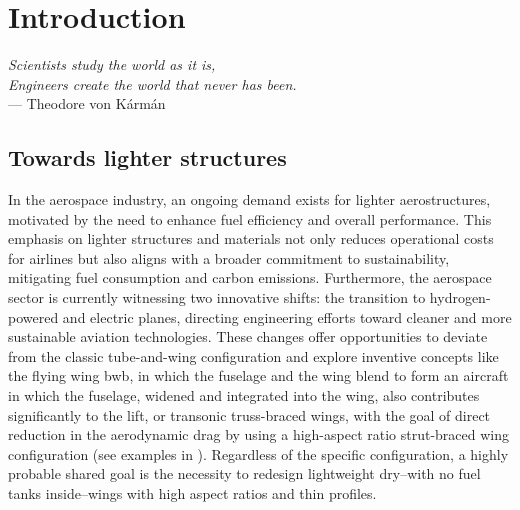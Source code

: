 \newpage
\chapter*{Introduction}
{}
%
\glsresetall %



\textit{Scientists study the world as it is,}\\
\textit{Engineers create the world that never has been.} \vspace{5pt} \\
--- Theodore von K\'arm\'an \\

\section*{Towards lighter structures}

In the aerospace industry, an ongoing demand exists for lighter aerostructures, motivated by the need to enhance fuel efficiency and overall performance. This emphasis on lighter structures and materials not only reduces operational costs for airlines but also aligns with a broader commitment to sustainability, mitigating fuel consumption and carbon emissions. Furthermore, the aerospace sector is currently witnessing two innovative shifts: the transition to hydrogen-powered and electric planes, directing engineering efforts toward cleaner and more sustainable aviation technologies. These changes offer opportunities to deviate from the classic tube-and-wing configuration and explore inventive concepts like the flying wing \gls{bwb}, in which the fuselage and the wing blend to form an aircraft in which the fuselage, widened and integrated into the wing, also contributes significantly to the lift, or transonic truss-braced wings, with the goal of direct reduction in the aerodynamic drag by using a high-aspect ratio strut-braced wing configuration (see examples in ). Regardless of the specific configuration, a highly probable shared goal is the necessity to redesign lightweight dry--\ie with no fuel tanks inside--wings with high aspect ratios and thin profiles.


